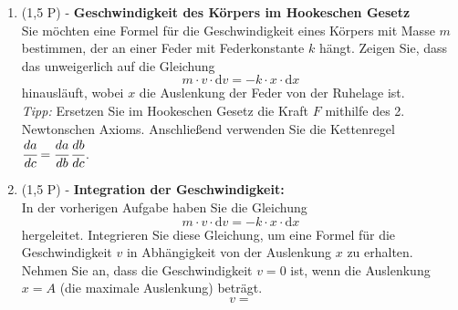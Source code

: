\documentclass[11pt, a4paper]{article}
\begin{document}
\begin{enumerate}[label=\textbf{\arabic*.},itemsep=0.45cm]
    \item (1,5 P) - \textbf{Geschwindigkeit des Körpers im Hookeschen Gesetz} \\
    Sie möchten eine Formel für die Geschwindigkeit eines Körpers mit Masse $m$ bestimmen, der an einer Feder mit Federkonstante $k$ hängt. Zeigen Sie, dass das unweigerlich auf die Gleichung 
    \begin{equation*}
        m \cdot v \cdot \mathrm{d}v = -k \cdot x \cdot \mathrm{d}x
    \end{equation*}
    hinausläuft, wobei $x$ die Auslenkung der Feder von der Ruhelage ist. \\
    \textit{Tipp: }Ersetzen Sie im Hookeschen Gesetz die Kraft $F$ mithilfe des 2. Newtonschen Axioms. Anschließend verwenden Sie die Kettenregel $\cfrac{da}{dc} = \cfrac{da}{db} \, \cfrac{db}{dc}$. 

    \item (1,5 P) - \textbf{Integration der Geschwindigkeit:} \\
    In der vorherigen Aufgabe haben Sie die Gleichung 
    \begin{equation*}
        m \cdot v \cdot \mathrm{d}v = -k \cdot x \cdot \mathrm{d}x
    \end{equation*}
    hergeleitet. Integrieren Sie diese Gleichung, um eine Formel für die Geschwindigkeit \(v\) in Abhängigkeit von der Auslenkung \(x\) zu erhalten. Nehmen Sie an, dass die Geschwindigkeit \(v = 0\) ist, wenn die Auslenkung \(x = A\) (die maximale Auslenkung) beträgt.
    \begin{equation*}
        v = 
    \end{equation*}
\end{enumerate}
\end{document}
